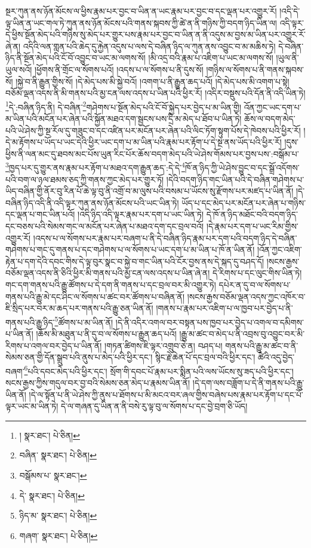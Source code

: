 སྔར་ཀུན་ནས་ཉོན་མོངས་ལ་ཕྱིས་རྣམ་པར་བྱང་བ་ཡིན་ན་ཡང་རྣམ་པར་བྱང་བ་དང་ལྡན་པར་འགྱུར་རོ། །འདི་དེ་ལྟ་ཡིན་ན་ཡང་གལ་ཏེ་ཀུན་ནས་ཉོན་མོངས་པའི་གནས་སྐབས་ཀྱི་ཚེ་ན་ནི་གཉིས་ཀྱི་བདག་ཉིད་ཡིན་ལ། འདི་ལྟར་དེ་ཕྱིས་སྔོན་མེད་པའི་གཉིས་སུ་མེད་པར་གྱུར་པས་རྣམ་པར་བྱང་བ་ཡིན་ན་ནི་འདུས་མ་བྱས་མ་ཡིན་པར་འགྱུར་རོ་ཞེ་ན། འདིའི་ལན་གླན་པའི་ཆེད་དུ་རྐྱེན་འདུས་པ་ལས་དེ་བཞིན་ཉིད་ལ་ཀུན་ནས་འབྱུང་བ་མ་མཆིས་ཏེ། དེ་བཞིན་ཉིད་ནི་སྔོན་མེད་པའི་ངོ་བོ་འབྱུང་བ་ཡང་མ་ལགས་སོ། །མི་འདྲ་བའི་རྣམ་པ་འཇིག་པ་ཡང་མ་ལགས་སོ། །ཡུལ་ནི་ཡུལ་སའོ། །ཕྱོགས་ནི་གྲོང་ལ་སོགས་པའོ། །འདས་པ་ལ་སོགས་པ་ནི་དུས་སོ། །གཉིས་ལ་སོགས་པ་ནི་གནས་སྐབས་སོ། །སྐྱེ་བ་ནི་རྒྱུན་གྱིས་སོ། །དེ་མེད་པས་མི་སྐྱེ་བའོ། །འགག་པ་ནི་རྒྱུན་ཆད་པའོ། །དེ་མེད་པས་མི་འགག་པ་སྟེ། བཅོམ་ལྡན་འདས་ནི་མི་གནས་པའི་མྱ་ངན་ལས་འདས་པ་ཡིན་པའི་ཕྱིར་རོ། །འདིར་བསྡུས་པའི་དོན་ནི་འདི་ཡིན་ཏེ། \footnote{།    སྣར་ཐང་།  པེ་ཅིན། }དེ་:བཞིན་ཉིད་ནི། དེ་བཞིན་\footnote{བཞིན་  སྣར་ཐང་།  པེ་ཅིན། }གཤེགས་པ་སྔོན་མེད་པའི་ངོ་བོ་སྐྱེད་པར་བྱེད་པ་མ་ཡིན་གྱི། འོན་ཀྱང་ཡང་དག་པ་མ་ཡིན་པའི་མངོན་པར་ཞེན་པའི་སྐྱོན་མཐའ་དག་སྦྱངས་པས་དྲི་མ་མེད་པ་ཐོབ་པ་ཡིན་ཏེ། ཆོས་ལ་བདག་མེད་པའི་ཡེ་ཤེས་ཀྱི་སྔ་རོལ་དུ་གཟུང་བ་དང་འཛིན་པར་མངོན་པར་ཞེན་པའི་ལིང་ཏོག་སྟུག་པོས་དེ་ཁེབས་པའི་ཕྱིར་རོ། །དེ་མ་རྟོགས་པ་ཡོད་པ་ཡང་དེའི་ཕྱིར་ཡང་དག་པ་མ་ཡིན་པའི་རྣམ་པར་རྟོག་པ་དེ་སྔ་ནས་ཡོད་པའི་ཕྱིར་རོ། །དུས་ཕྱིས་ནི་ལན་མང་དུ་ཐབས་མང་པོས་ཡུན་རིང་པོར་ཆོས་བདག་མེད་པའི་ཡེ་ཤེས་གོམས་པར་བྱས་པས་:བསྒོམ་པ་\footnote{བསྒོམས་པ་  སྣར་ཐང་། }ཁྱད་པར་དུ་གྱུར་ནས་རྣམ་པར་རྟོག་པ་མཐའ་དག་རྒྱུན་ཆད་:དེ་དེ་\footnote{དེ་  སྣར་ཐང་།  པེ་ཅིན། }ཁོ་ན་ཉིད་ཀྱི་ཡེ་ཤེས་བྱུང་བ་དང་སྒྲོ་འདོགས་པའི་བག་ལ་ཉལ་ཐམས་ཅད་ཀྱི་གནས་ཀྱང་མེད་པར་གྱུར་ཏོ། །དེའི་བདག་ཉིད་གང་ཡིན་པའི་དེ་བཞིན་གཤེགས་པ་ཡིད་བཞིན་གྱི་ནོར་བུ་རིན་པོ་ཆེ་ལྟ་བུ་ནི་འགྲོ་བ་མ་ལུས་པའི་བསམ་པ་ཡོངས་སུ་རྫོགས་པར་མཛད་པ་ཡིན་ནོ། །དེ་བཞིན་ཉིད་འདི་ནི་འདི་ལྟར་ཀུན་ནས་ཉོན་མོངས་པའི་ཡང་ཡིན་ཏེ། ཡོད་པ་དང་མེད་པར་མངོན་པར་ཞེན་པ་གཉིས་དང་ལྡན་པ་གང་ཡིན་པའོ། །འདི་ཉིད་འདི་ལྟར་རྣམ་པར་དག་པ་ཡང་ཡིན་ཏེ། དེ་ཁོ་ན་ཉིད་མཐོང་བའི་བདག་ཉིད་དང་བཅས་པའི་སེམས་གང་ལ་མངོན་པར་ཞེན་པ་མཐའ་དག་དང་བྲལ་བའོ། །དེ་རྣམ་པར་དག་པ་ཡང་རིམ་གྱིས་འགྱུར་རོ། །འདས་པ་ལ་སོགས་པར་རྣམ་པར་བཞག་པ་ནི་དེ་བཞིན་ཉིད་རྣམ་པར་དག་པའི་བདག་ཉིད་དེ་བཞིན་གཤེགས་པ་གང་དུ་གནས་པ་དང་གཤེགས་པ་ལ་སོགས་པ་ཡང་དག་པ་མ་ཡིན་པ་ཁོ་ན་ཡིན་ནོ། །འོན་ཀྱང་འཇིག་རྟེན་པ་དག་དེའི་དབང་གིས་དེ་ལྟ་བུར་སྣང་བ་སྐྱེ་བ་གང་ཡིན་པའི་ངོར་བྱས་ནས་དེ་སྐད་དུ་བཤད་དོ། །སངས་རྒྱས་བཅོམ་ལྡན་འདས་ནི་ཅིའི་ཕྱིར་མི་གནས་པའི་མྱ་ངན་ལས་འདས་པ་ཡིན་ཞེ་ན། དེ་རིགས་པ་དང་ལུང་གིས་ཡིན་ཏེ། གང་དག་གནས་པའི་རྒྱུ་ཚོགས་པ་དེ་དག་ནི་གནས་པ་དང་བྲལ་བར་མི་འགྱུར་ཏེ། དཔེར་ན་དུ་བ་ལ་སོགས་པ་གནས་པའི་རྒྱུ་མེ་དང་ཤིང་ལ་སོགས་པ་ཚང་བར་ཚོགས་པ་བཞིན་ནོ། །སངས་རྒྱས་བཅོམ་ལྡན་འདས་ཀྱང་འཁོར་བ་ཇི་སྲིད་པར་བར་མ་ཆད་པར་གནས་པའི་རྒྱུ་ཅན་ཡིན་ནོ། །གནས་པ་རྣམ་པར་འཇིག་པ་ལ་ཁྱབ་པར་བྱེད་པ་ནི་གནས་པའི་རྒྱུ་ཉིད་\footnote{ཉིད་མ་  སྣར་ཐང་།  པེ་ཅིན། }ཚོགས་པ་མ་ཡིན་ནོ། །དེ་ནི་འདིར་འགལ་བར་བསྟན་པས་ཁྱབ་པར་བྱེད་པ་འགལ་བ་དམིགས་པ་ཡིན་ནོ། །ཆོས་མི་མཐུན་པ་ནི་དུ་བ་ལ་སོགས་པ་རྒྱུན་ཆད་པའོ། །རྒྱུ་མ་ཚང་བ་མེད་པ་ནི་འབྲས་བུ་འབྱུང་བར་མི་རིགས་པ་འགལ་བར་བྱེད་པ་ཡིན་ནོ། །གཏན་ཚིགས་ཇི་ལྟར་འགྲུབ་ཅེ་ན། བཤད་པ། གནས་པའི་རྒྱུ་མ་ཚང་བ་ནི་སེམས་ཅན་གྱི་དོན་སྒྲུབ་པའི་ནུས་པ་མེད་པའི་ཕྱིར་དང་། སྙིང་རྗེ་ཆེན་པོ་དང་བྲལ་བའི་ཕྱིར་དང་། ཚེའི་འདུ་བྱེད་བཞག་\footnote{གཞག་  སྣར་ཐང་།  པེ་ཅིན། }པའི་དབང་མེད་པའི་ཕྱིར་དང་། སྲོག་གི་དབང་པོ་རྣམ་པར་སྨིན་པའི་ལས་ཡོངས་སུ་ཟད་པའི་ཕྱིར་དང་། སངས་རྒྱས་ཀྱིས་གདུལ་བར་བྱ་བའི་སེམས་ཅན་མེད་པ་རྣམས་ཡིན་ནོ། །དེ་དག་ལས་བཟློག་པ་དེ་ནི་གནས་པའི་རྒྱུ་ཡིན་ནོ། །དེ་ལ་སྟོན་པ་ནི་ཡེ་ཤེས་ཀྱི་ནུས་པ་ཐོགས་པ་མི་མངའ་བར་ཞལ་གྱིས་བཞེས་པས་རྣམ་པར་རྟོག་པ་དང་པོ་ལྟར་ཡང་མ་ཡིན་ཏེ། དེ་ལ་གཞན་དུ་ཡིན་ན་ནི་བསེ་རུ་ལྟ་བུ་ལ་སོགས་པ་དང་བྱེ་བྲག་ཅི་ཡོད། 